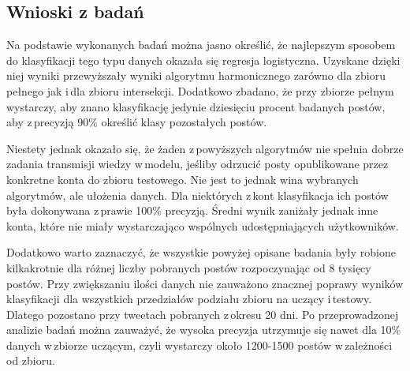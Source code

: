 \subsection{Wnioski z badań}
Na podstawie wykonanych badań można jasno określić, że najlepszym sposobem do klasyfikacji tego typu danych okazała się regresja logistyczna. Uzyskane dzięki niej wyniki przewyższały wyniki algorytmu harmonicznego zarówno dla zbioru pełnego jak i\,dla zbioru intersekcji. Dodatkowo zbadano, że przy zbiorze pełnym wystarczy, aby znano klasyfikację jedynie dziesięciu procent badanych postów, aby z\,precyzją 90\% określić klasy pozostałych postów. 
\par
	Niestety jednak okazało się, że żaden z\,powyższych algorytmów nie spełnia dobrze zadania transmisji wiedzy w\,modelu, jeśliby odrzucić posty opublikowane przez konkretne konta do zbioru testowego. Nie jest to jednak wina wybranych algorytmów, ale ułożenia danych. Dla niektórych z\,kont klasyfikacja ich postów była dokonywana z\,prawie 100\% precyzją. Średni wynik zaniżały jednak inne konta, które nie miały wystarczająco wspólnych udostępniających użytkowników. 
\par
Dodatkowo warto zaznaczyć, że wszystkie powyżej opisane badania były robione kilkakrotnie dla różnej liczby pobranych postów rozpoczynając od 8 tysięcy postów. Przy zwiększaniu ilości danych nie zauważono znacznej poprawy wyników klasyfikacji dla wszystkich przedziałów podziału zbioru na uczący i\,testowy. Dlatego pozostano przy tweetach pobranych z\,okresu 20 dni. Po przeprowadzonej analizie badań można zauważyć, że wysoka precyzja utrzymuje się nawet dla 10\% danych w\,zbiorze uczącym, czyli wystarczy około 1200-1500 postów w\,zależności od zbioru.
